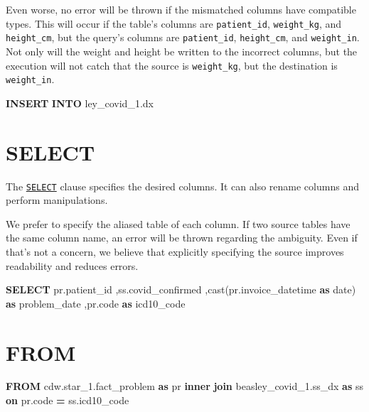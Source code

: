 \documentclass[
]{book}
\newenvironment{Shaded}{\begin{snugshade}}{\end{snugshade}}
\newcommand{\DataTypeTok}[1]{\textcolor[rgb]{0.13,0.29,0.53}{#1}}
\newcommand{\FunctionTok}[1]{\textcolor[rgb]{0.00,0.00,0.00}{#1}}
\newcommand{\KeywordTok}[1]{\textcolor[rgb]{0.13,0.29,0.53}{\textbf{#1}}}
\newcommand{\NormalTok}[1]{#1}
\newcommand{\OperatorTok}[1]{\textcolor[rgb]{0.81,0.36,0.00}{\textbf{#1}}}
\begin{document}
Even worse, no error will be thrown if the mismatched columns have compatible types. This will occur if the table's columns are \texttt{patient\_id}, \texttt{weight\_kg}, and \texttt{height\_cm}, but the query's columns are \texttt{patient\_id}, \texttt{height\_cm}, and \texttt{weight\_in}. Not only will the weight and height be written to the incorrect columns, but the execution will not catch that the source is \texttt{weight\_kg}, but the destination is \texttt{weight\_in}.

\begin{Shaded}
\begin{Highlighting}[]
\KeywordTok{INSERT} \KeywordTok{INTO}\NormalTok{ ley\_covid\_1.dx}
\end{Highlighting}
\end{Shaded}

\hypertarget{sql-select}{%
\section{SELECT}\label{sql-select}}

The \href{https://www.w3schools.com/sql/sql_select.asp}{\texttt{SELECT}} clause specifies the desired columns. It can also rename columns and perform manipulations.

We prefer to specify the aliased table of each column. If two source tables have the same column name, an error will be thrown regarding the ambiguity. Even if that's not a concern, we believe that explicitly specifying the source improves readability and reduces errors.

\begin{Shaded}
\begin{Highlighting}[]
\KeywordTok{SELECT}
\NormalTok{  pr.patient\_id}
\NormalTok{  ,ss.covid\_confirmed}
\NormalTok{  ,}\FunctionTok{cast}\NormalTok{(pr.invoice\_datetime }\KeywordTok{as} \DataTypeTok{date}\NormalTok{) }\KeywordTok{as}\NormalTok{ problem\_date}
\NormalTok{  ,pr.code                           }\KeywordTok{as}\NormalTok{ icd10\_code}
\end{Highlighting}
\end{Shaded}

\hypertarget{sql-from}{%
\section{FROM}\label{sql-from}}

\begin{Shaded}
\begin{Highlighting}[]
\KeywordTok{FROM}\NormalTok{ cdw.star\_1.fact\_problem       }\KeywordTok{as}\NormalTok{ pr}
  \KeywordTok{inner} \KeywordTok{join}\NormalTok{ beasley\_covid\_1.ss\_dx }\KeywordTok{as}\NormalTok{ ss }\KeywordTok{on}\NormalTok{ pr.code }\OperatorTok{=}\NormalTok{ ss.icd10\_code}
\end{Highlighting}
\end{Shaded}
\end{document}
